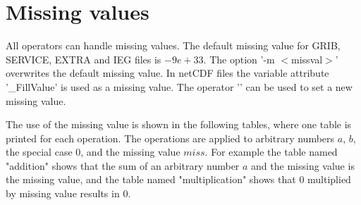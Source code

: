 \section{Missing values}

All operators can handle missing values.
The default missing value for GRIB, SERVICE, EXTRA and IEG files is $-9e+33$. 
The \CDO option '-m $<$missval$>$' overwrites the default missing value.
In netCDF files the variable attribute '\_FillValue' is used as a missing value.
The operator '' can be used to set a new missing value.

The \CDO use of the missing value is shown in the following tables,
where one table is printed for each operation.
The operations are applied to arbitrary numbers $a$, $b$, the special case $0$,
and the missing value $miss$.
For example the table named "addition" shows that the sum of an
arbitrary number $a$ and the missing value is the missing value,
and the table named "multiplication" shows that $0$ multiplied by missing
value results in $0$.

